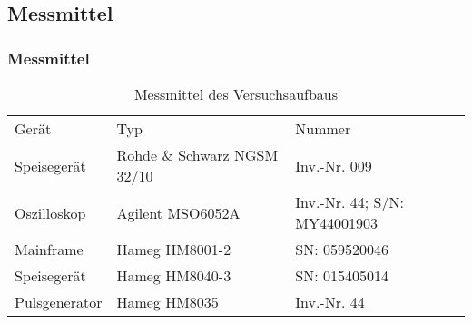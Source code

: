 \ifSTANDALONE
\subsection{Messmittel}
\fi
\ifEMBED
\subsubsection{Messmittel}
\fi
    \begin{table}[h!]
        \centering
        \begin{tabular}{lll}
            \rowcolor{gray}
            Gerät &
                Typ &
                Nummer \\
            Speisegerät & 
                Rohde \& Schwarz NGSM 32/10 &
                Inv.-Nr. 009 \\
            Oszilloskop &
                Agilent MSO6052A &
                Inv.-Nr. 44; S/N: MY44001903 \\
            Mainframe &
                Hameg HM8001-2 &
                SN: 059520046 \\
            Speisegerät &
                Hameg HM8040-3 &
                SN: 015405014 \\
            Pulsgenerator &
                Hameg HM8035 &
                Inv.-Nr. 44 \\
        \end{tabular}
        \caption{Messmittel des Versuchsaufbaus}
    \end{table}
